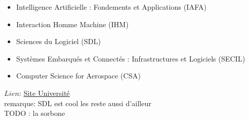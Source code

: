 \documentclass[a4paper,11pt]{article}
\begin{document}
\begin{enumerate}
                    \begin{itemize}
                        \item Intelligence Artificielle : Fondements et Applications (IAFA)
                        \item Interaction Homme Machine (IHM)
                        \item Sciences du Logiciel (SDL)
                        \item Systèmes Embarqués et Connectés : Infrastructures et Logiciels (SECIL)
                        \item Computer Science for Aerospace (CSA)
                    \end{itemize}
                    $Lien$: \href{https://departement-informatique.univ-tlse3.fr/master/master-informatique-2021-2026/}{Site Université}
                    \\ remarque: SDL est cool les reste aussi d'ailleur
\\TODO : la sorbone
    \end{enumerate}
\end{document}
